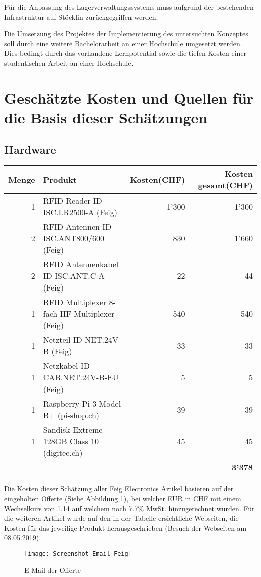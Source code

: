 Für die Anpassung des Lagerverwaltungssystems muss aufgrund der bestehenden Infrastruktur auf Stöcklin zurückgegriffen werden.

Die Umsetzung des Projektes der Implementierung des untersuchten Konzeptes soll durch eine weitere Bachelorarbeit an einer Hochschule umgesetzt werden. Dies bedingt durch das vorhandene Lernpotential sowie die tiefen Kosten einer studentischen Arbeit an einer Hochschule.

\section{Geschätzte Kosten und Quellen für die Basis dieser Schätzungen}
\subsection{Hardware}
\begin{tabularx}{\textwidth}{|r|X|r|r|}
	\hline
	\textbf{Menge} & \textbf{Produkt} & \textbf{Kosten(CHF)} & \textbf{Kosten gesamt(CHF)} \\
	\hline
	1 & RFID Reader ID ISC.LR2500-A (Feig) & 1'300 & 1'300 \\
	\hline
	2 & RFID Antennen ID ISC.ANT800/600 (Feig)& 830 & 1'660 \\
	\hline
	2 & RFID Antennenkabel ID ISC.ANT.C-A (Feig) & 22 & 44 \\
	\hline
	1 & RFID Multiplexer 8-fach HF Multiplexer (Feig) & 540 & 540 \\
	\hline
	1 & Netzteil ID NET.24V-B (Feig) & 33 & 33 \\
	\hline
	1 & Netzkabel ID CAB.NET.24V-B-EU (Feig) & 5 & 5 \\
	\hline
	1 & Raspberry Pi 3 Model B+ (pi-shop.ch)& 39 & 39 \\
	\hline
	1 & Sandisk Extreme 128GB Class 10 (digitec.ch)& 45 & 45 \\
	\hline
	& & & \textbf{3'378} \\
	\hline
\end{tabularx}

Die Kosten dieser Schätzung aller Feig Electronics Artikel basieren auf der eingeholten Offerte (Siehe Abbildung \ref{fig:offerteFeig}), bei welcher EUR in CHF mit einem Wechselkurs von 1.14 auf welchem noch 7.7\% MwSt. hinzugerechnet wurden.
Für die weiteren Artikel wurde auf den in der Tabelle ersichtliche Webseiten, die Kosten für das jeweilige Produkt herausgeschrieben (Besuch der Webseiten am 08.05.2019).

\begin{figure}[htb]
	\centering
	\texttt{[image: Screenshot\_Email\_Feig]}
	\caption{E-Mail der Offerte}
	\label{fig:offerteFeig}
\end{figure}

